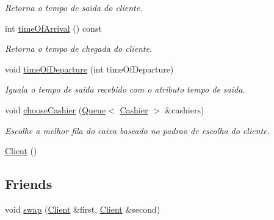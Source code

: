 \begin{DoxyCompactItemize}
\begin{DoxyCompactList}\small\item\em Retorna o tempo de saida do cliente. \end{DoxyCompactList}\item 
int \hyperlink{classClient_af327f525b4cf7838d97c095c8dd00e60}{time\-Of\-Arrival} () const 
\begin{DoxyCompactList}\small\item\em Retorna o tempo de chegada do cliente. \end{DoxyCompactList}\item 
void \hyperlink{classClient_a282e19d2e25da6d8ee8a5c8ad5f0bdd7}{time\-Of\-Departure} (int time\-Of\-Departure)
\begin{DoxyCompactList}\small\item\em Iguala o tempo de saida recebido com o atributo tempo de saida. \end{DoxyCompactList}\item 
void \hyperlink{classClient_a692860756fa31e443b61d5a897f0f46b}{choose\-Cashier} (\hyperlink{classQueue}{Queue}$<$ \hyperlink{classCashier}{Cashier} $>$ \&cashiers)
\begin{DoxyCompactList}\small\item\em Escolhe a melhor fila do caixa baseado no padrao de escolha do cliente. \end{DoxyCompactList}\item 
\hyperlink{classClient_ae51af7aa6b8f591496a8f6a4a87a14bf}{Client} ()
\end{DoxyCompactItemize}
\subsection*{Friends}
\begin{DoxyCompactItemize}
\item 
void \hyperlink{classClient_a359e644998b9e1c2adf9d9afe3e04d8c}{swap} (\hyperlink{classClient}{Client} \&first, \hyperlink{classClient}{Client} \&second)
\end{DoxyCompactItemize}


